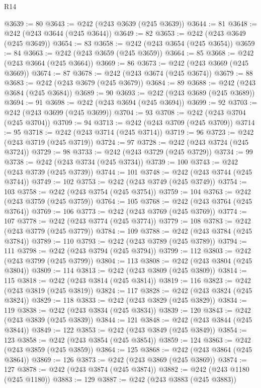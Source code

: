 \begin{lexlean}{R14}
\begin{coremodule}
@3639 := 80
@3643 := @242 (@243 @3639 (@245 @3639))
@3644 := 81
@3648 := @242 (@243 @3644 (@245 @3644))
@3649 := 82
@3653 := @242 (@243 @3649 (@245 @3649))
@3654 := 83
@3658 := @242 (@243 @3654 (@245 @3654))
@3659 := 84
@3663 := @242 (@243 @3659 (@245 @3659))
@3664 := 85
@3668 := @242 (@243 @3664 (@245 @3664))
@3669 := 86
@3673 := @242 (@243 @3669 (@245 @3669))
@3674 := 87
@3678 := @242 (@243 @3674 (@245 @3674))
@3679 := 88
@3683 := @242 (@243 @3679 (@245 @3679))
@3684 := 89
@3688 := @242 (@243 @3684 (@245 @3684))
@3689 := 90
@3693 := @242 (@243 @3689 (@245 @3689))
@3694 := 91
@3698 := @242 (@243 @3694 (@245 @3694))
@3699 := 92
@3703 := @242 (@243 @3699 (@245 @3699))
@3704 := 93
@3708 := @242 (@243 @3704 (@245 @3704))
@3709 := 94
@3713 := @242 (@243 @3709 (@245 @3709))
@3714 := 95
@3718 := @242 (@243 @3714 (@245 @3714))
@3719 := 96
@3723 := @242 (@243 @3719 (@245 @3719))
@3724 := 97
@3728 := @242 (@243 @3724 (@245 @3724))
@3729 := 98
@3733 := @242 (@243 @3729 (@245 @3729))
@3734 := 99
@3738 := @242 (@243 @3734 (@245 @3734))
@3739 := 100
@3743 := @242 (@243 @3739 (@245 @3739))
@3744 := 101
@3748 := @242 (@243 @3744 (@245 @3744))
@3749 := 102
@3753 := @242 (@243 @3749 (@245 @3749))
@3754 := 103
@3758 := @242 (@243 @3754 (@245 @3754))
@3759 := 104
@3763 := @242 (@243 @3759 (@245 @3759))
@3764 := 105
@3768 := @242 (@243 @3764 (@245 @3764))
@3769 := 106
@3773 := @242 (@243 @3769 (@245 @3769))
@3774 := 107
@3778 := @242 (@243 @3774 (@245 @3774))
@3779 := 108
@3783 := @242 (@243 @3779 (@245 @3779))
@3784 := 109
@3788 := @242 (@243 @3784 (@245 @3784))
@3789 := 110
@3793 := @242 (@243 @3789 (@245 @3789))
@3794 := 111
@3798 := @242 (@243 @3794 (@245 @3794))
@3799 := 112
@3803 := @242 (@243 @3799 (@245 @3799))
@3804 := 113
@3808 := @242 (@243 @3804 (@245 @3804))
@3809 := 114
@3813 := @242 (@243 @3809 (@245 @3809))
@3814 := 115
@3818 := @242 (@243 @3814 (@245 @3814))
@3819 := 116
@3823 := @242 (@243 @3819 (@245 @3819))
@3824 := 117
@3828 := @242 (@243 @3824 (@245 @3824))
@3829 := 118
@3833 := @242 (@243 @3829 (@245 @3829))
@3834 := 119
@3838 := @242 (@243 @3834 (@245 @3834))
@3839 := 120
@3843 := @242 (@243 @3839 (@245 @3839))
@3844 := 121
@3848 := @242 (@243 @3844 (@245 @3844))
@3849 := 122
@3853 := @242 (@243 @3849 (@245 @3849))
@3854 := 123
@3858 := @242 (@243 @3854 (@245 @3854))
@3859 := 124
@3863 := @242 (@243 @3859 (@245 @3859))
@3864 := 125
@3868 := @242 (@243 @3864 (@245 @3864))
@3869 := 126
@3873 := @242 (@243 @3869 (@245 @3869))
@3874 := 127
@3878 := @242 (@243 @3874 (@245 @3874))
@3882 := @242 (@243 @1180 (@245 @1180))
@3883 := 129
@3887 := @242 (@243 @3883 (@245 @3883))

\end{coremodule}
\end{lexlean}
